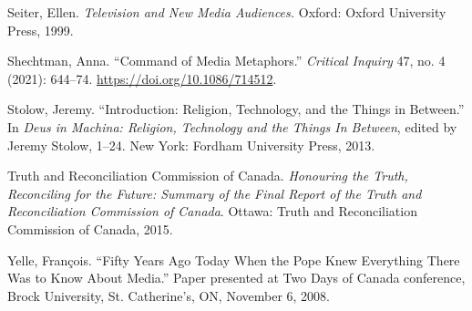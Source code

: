 \documentclass{tufte-handout}
\begin{document}
\begin{hangparas}{.25in}{1}
Seiter, Ellen. \emph{Television and New Media Audiences.} Oxford: Oxford
University Press, 1999.

Shechtman, Anna. ``Command of Media Metaphors.'' \emph{Critical Inquiry}
47, no. 4 (2021): 644--74. \url{https://doi.org/10.1086/714512}.

Stolow, Jeremy. ``Introduction: Religion, Technology, and the Things in
Between.'' In \emph{Deus in Machina: Religion, Technology and the Things
In Between}, edited by Jeremy Stolow, 1--24. New York: Fordham
University Press, 2013.

Truth and Reconciliation Commission of Canada. \emph{Honouring the
Truth, Reconciling for the Future: Summary of the Final Report of the
Truth and Reconciliation Commission of Canada}. Ottawa: Truth and
Reconciliation Commission of Canada, 2015.

Yelle, François. ``Fifty Years Ago Today When the Pope Knew Everything
There Was to Know About Media.'' Paper presented at Two Days of Canada
conference, Brock University, St. Catherine's, ON, November 6, 2008.



\end{hangparas}
\end{document}
